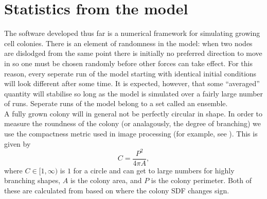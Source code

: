\section{Statistics from the model}
The software developed thus far is a numerical framework for simulating growing cell colonies.
There is an element of randomness in the model: when two nodes are dislodged from the 
same point there is initially no preferred direction to move in so one must be chosen randomly
before other forces can take effect. For this reason, every seperate run of the model 
starting with identical initial conditions will look different after some time. 
It is expected, however, that some ``averaged''
quantity will stabilise so long as the model is simulated over a fairly large number of runs.
Seperate runs of the model belong to a set called an ensemble.
\\

A fully grown colony will in general not be perfectly circular in shape.
In order to measure the roundness of the colony (or analagously, the degree of branching) 
we use the compactness metric used in image processing (for example, see \cite{li2024off}). This is given by
\begin{equation}
  C = \frac{P^2}{4 \pi A},
\end{equation}
where $C \in [1, \infty)$ is $1$ for a circle and can get to large numbers for 
highly branching shapes, $A$ is the colony area, and $P$ is the colony perimeter. 
Both of these are calculated from based on where the colony SDF changes sign. 
\\


